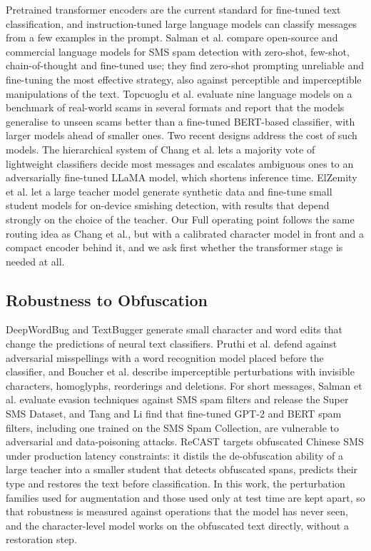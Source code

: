Pretrained transformer encoders \cite{devlin2019,sanh2019,liu2019} are the current standard for fine-tuned text classification, and instruction-tuned large language models \cite{qwen2024} can classify messages from a few examples in the prompt. Salman et al. \cite{salman2025spallm} compare open-source and commercial language models for SMS spam detection with zero-shot, few-shot, chain-of-thought and fine-tuned use; they find zero-shot prompting unreliable and fine-tuning the most effective strategy, also against perceptible and imperceptible manipulations of the text. Topcuoglu et al. \cite{topcuoglu2026} evaluate nine language models on a benchmark of real-world scams in several formats and report that the models generalise to unseen scams better than a fine-tuned BERT-based classifier, with larger models ahead of smaller ones. Two recent designs address the cost of such models. The hierarchical system of Chang et al. \cite{chang2025scamshield} lets a majority vote of lightweight classifiers decide most messages and escalates ambiguous ones to an adversarially fine-tuned LLaMA model, which shortens inference time. ElZemity et al. \cite{elzemity2026} let a large teacher model generate synthetic data and fine-tune small student models for on-device smishing detection, with results that depend strongly on the choice of the teacher. Our Full operating point follows the same routing idea as Chang et al., but with a calibrated character model in front and a compact encoder behind it, and we ask first whether the transformer stage is needed at all.

\subsection{Robustness to Obfuscation}\label{sec:rel-robust}

DeepWordBug \cite{gao2018} and TextBugger \cite{li2019} generate small character and word edits that change the predictions of neural text classifiers. Pruthi et al. \cite{pruthi2019} defend against adversarial misspellings with a word recognition model placed before the classifier, and Boucher et al. \cite{boucher2022} describe imperceptible perturbations with invisible characters, homoglyphs, reorderings and deletions. For short messages, Salman et al. \cite{salman2024} evaluate evasion techniques against SMS spam filters and release the Super SMS Dataset, and Tang and Li \cite{tang2025} find that fine-tuned GPT-2 and BERT spam filters, including one trained on the SMS Spam Collection, are vulnerable to adversarial and data-poisoning attacks. ReCAST \cite{huang2026recast} targets obfuscated Chinese SMS under production latency constraints: it distils the de-obfuscation ability of a large teacher into a smaller student that detects obfuscated spans, predicts their type and restores the text before classification. In this work, the perturbation families used for augmentation and those used only at test time are kept apart, so that robustness is measured against operations that the model has never seen, and the character-level model works on the obfuscated text directly, without a restoration step.

